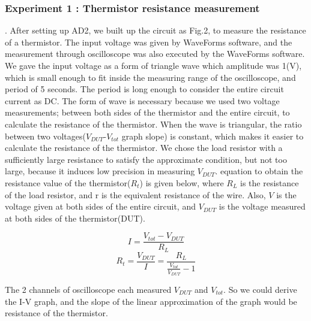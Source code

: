 \documentclass[5p,sort&compress]{elsarticle}
\begin{document}
\subsubsection{Experiment 1 : Thermistor resistance measurement}
.\newline
After setting up AD2, we built up the circuit as Fig.2, to measure the resistance of a thermistor. The input voltage was given by WaveForms software, and the measurement through oscilloscope was also executed by the WaveForms software. We gave the input voltage as a form of triangle wave which amplitude was 1(V), which is small enough to fit inside the measuring range of the oscilloscope, and period of 5 seconds. The period is long enough to consider the entire circuit current as DC. The form of wave is necessary because we used two voltage measurements; between both sides of the thermistor and the entire circuit, to calculate the resistance of the thermistor. When the wave is triangular, the ratio between two voltages($V_{DUT}$-$V_{tot}$ graph slope) is constant, which makes it easier to calculate the resistance of the thermistor. We chose the load resistor  with a sufficiently large resistance to satisfy the approximate condition, but not too large, because it induces low precision in measuring $V_{DUT}$.
equation to obtain the resistance value of the thermistor($R_{t}$) is given below, where $R_{L}$ is the resistance of the load resistor, and r is the equivalent resistance of the wire. Also, $V$ is the voltage given at both sides of the entire circuit, and $V_{DUT}$ is the voltage measured at both sides of the thermistor(DUT).

\begin{equation}\label{eqfitting}
    I = \frac{V_{tot}-V_{DUT}}{R_{L}}
\end{equation}
\begin{equation}\label{eqfitting}
    R_{t} = \frac{V_{DUT}}{I}=\frac{R_{L}}{\frac{V_{tot}}{V_{DUT}}-1}
\end{equation}

The 2 channels of oscilloscope each measured $V_{DUT}$ and $V_{tot}$. So we could derive the I-V graph, and the slope of the linear approximation of the graph would be resistance of the thermistor.
\end{document}
